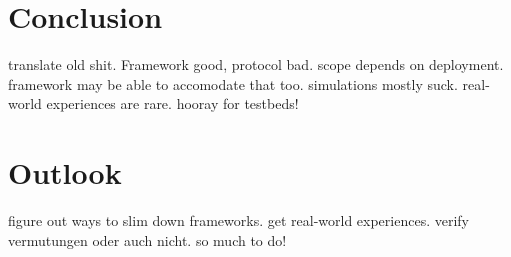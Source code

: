 \documentclass[a4paper,10pt]{scrartcl}
\begin{document}
\section{Conclusion}
\label{sec:conclusion}
translate old shit. Framework good, protocol bad. scope depends on deployment. framework may be able to accomodate that too. simulations mostly suck. real-world experiences are rare. hooray for testbeds!

\section{Outlook}
\label{sec:outlook}
figure out ways to slim down frameworks.
get real-world experiences. verify vermutungen oder auch nicht. so much to do!

\printglossaries

{\small


}
\end{document}

